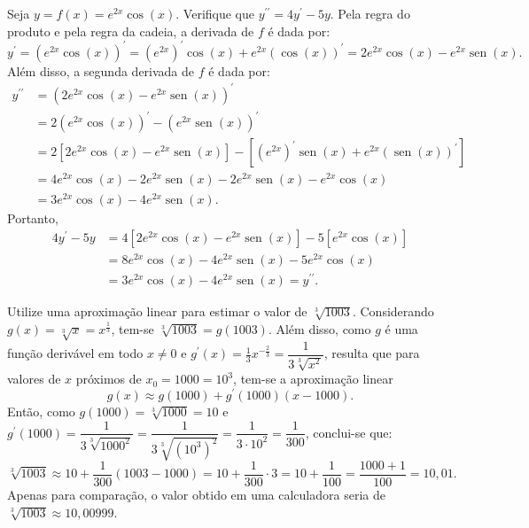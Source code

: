 \documentclass[12pt,a4paper]{article}
\newcommand*\sen{\operatorname{sen}}
\begin{document}
\begin{ExerciseList}
\Exercise[title={2,0}] Seja $y = f(x) = e^{2x} \cos(x)$. Verifique que $y^{\prime\prime} = 4 y^\prime - 5 y$.
\Answer Pela regra do produto e pela regra da cadeia, a derivada de $f$ é dada por:
\[
    y^\prime
    = (e^{2x} \cos(x))^\prime
    = (e^{2x})^\prime \cos(x) + e^{2x}(\cos(x))^\prime
    = 2e^{2x} \cos(x) - e^{2x} \sen(x).
\]
Além disso, a segunda derivada de $f$ é dada por:
\begin{align*}
    y^{\prime\prime}
    & = (2e^{2x} \cos(x) - e^{2x} \sen(x))^\prime \\
    & = 2(e^{2x} \cos(x))^\prime - (e^{2x} \sen(x))^\prime \\
    & = 2[2e^{2x} \cos(x) - e^{2x} \sen(x)]
      - [(e^{2x})^\prime \sen(x) + e^{2x}(\sen(x))^\prime] \\
    & = 4e^{2x} \cos(x) - 2e^{2x} \sen(x)
    - 2e^{2x} \sen(x) - e^{2x}\cos(x) \\
    & = 3e^{2x} \cos(x) - 4e^{2x} \sen(x).
\end{align*}
Portanto,
\begin{align*}
    4 y^\prime - 5 y
    & = 4[2e^{2x} \cos(x) - e^{2x} \sen(x)] - 5[e^{2x} \cos(x)] \\
    & = 8e^{2x} \cos(x) - 4e^{2x} \sen(x) - 5e^{2x} \cos(x) \\
    & = 3e^{2x} \cos(x) - 4e^{2x} \sen(x) = y^{\prime\prime}.
\end{align*}

\Exercise[title={2,0}] Utilize uma aproximação linear para estimar o valor de $\sqrt[3]{1003}$.
\Answer Considerando $g(x) = \sqrt[3]{x} = x^{\frac{1}{3}}$, tem-se $\sqrt[3]{1003} = g(1003)$. Além disso, como $g$ é uma função derivável em todo $x \neq 0$ e $g^\prime(x) = \frac{1}{3}x^{-\frac{2}{3}} = \dfrac{1}{3\sqrt[3]{x^2}}$, resulta que para valores de $x$ próximos de $x_0 = 1000 = 10^3$, tem-se a aproximação linear
\[
    g(x) \approx g(1000) + g^\prime(1000)(x - 1000).
\]
Então, como $g(1000) = \sqrt[3]{1000} = 10$ e $g^\prime(1000) = \dfrac{1}{3\sqrt[3]{1000^2}} = \dfrac{1}{3\sqrt[3]{(10^3)^2}} = \dfrac{1}{3\cdot 10^2} = \dfrac{1}{300}$, conclui-se que:
\[
    \sqrt[3]{1003}
    \approx 10 + \dfrac{1}{300}(1003 - 1000)
    = 10 + \dfrac{1}{300}\cdot 3
    = 10 + \dfrac{1}{100}
    = \dfrac{1000 + 1}{100}
    = 10,01.
\]
Apenas para comparação, o valor obtido em uma calculadora seria de $\sqrt[3]{1003} \approx 10,00999$.


\end{ExerciseList}
\end{document}
